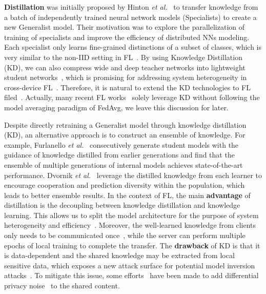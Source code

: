 \textbf{Distillation} was initially proposed by Hinton \textit{et al.}~\cite{hinton2015distilling} to transfer knowledge from a batch of independently trained neural network models (Specialists) to create a new Generalist model.
Their motivation was to explore the parallelization of training of specialists and improve the efficiency of distributed NNs modeling\cite{dean2012large}.
Each specialist only learns fine-grained distinctions of a subset of classes, which is very similar to the non-IID setting in FL~\cite{liqb2022federated}.
By using Knowledge Distillation (KD), we can also compress wide and deep teacher networks into lightweight student networks~\cite{romero2015fitnets}, which is promising for addressing system heterogeneity in cross-device FL~\cite{lim2020federated}.
Therefore, it is natural to extend the KD technologies to FL filed~\cite{jiang2020federated, li2020practical, li2019fedmd, wu2022communication, chen2020fedbe, lin2020ensemble, gong2021ensemble, sun2020federated}.
Actually, many recent FL works~\cite{li2019fedmd, gong2021ensemble, sun2020federated, huang2022learn, fang2022robust, gong2022preserving, luo2022fediris, sui2020feded, chang2021cronus, he2020group, zhang2021parameterized, itahara2021distillation} solely leverage KD without following the model averaging paradigm of FedAvg, we leave this discussion for later. %

Despite directly retraining a Generalist model through knowledge distillation (KD), an alternative approach is to construct an ensemble of knowledge.
For example, Furlanello \textit{et al.}~\cite{furlanello2018born} consecutively generate student models with the guidance of knowledge distilled from earlier generations and find that the ensemble of multiple generations of internal models achieves state-of-the-art performance.
Dvornik \textit{et al.}~\cite{dvornik2019diversity} leverage the distilled knowledge from each learner to encourage cooperation and prediction diversity within the population, which leads to better ensemble results.
In the context of FL, the main \textbf{advantage} of distillation is the decoupling between knowledge distillation and knowledge learning. 
This allows us to split the model architecture for the purpose of system heterogeneity and efficiency~\cite{vepakomma2019split, thapa2022splitfed}.
Moreover, the well-learned knowledge from clients only needs to be communicated once~\cite{gong2021ensemble, gong2022preserving}, while the server can perform multiple epochs of local training to complete the transfer.
The \textbf{drawback} of KD is that it is data-dependent and the shared knowledge may be extracted from local sensitive data, which exposes a new attack surface for potential model inversion attacks~\cite{kim2020multiple, fredrikson2015model}.
To mitigate this issue, some efforts~\cite{wang2022fedkc, fan2022private} have been made to add differential privacy noise~\cite{dwork2006differential} to the shared content.

